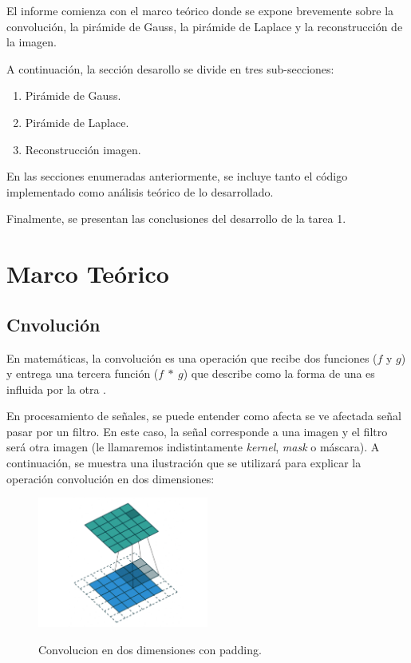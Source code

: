 \par El informe comienza con el marco teórico donde se expone brevemente sobre la convolución, la pirámide de Gauss, la pirámide de Laplace y la reconstrucción de la imagen. 

\par A continuación, la sección desarollo se divide en tres sub-secciones:
\begin{enumerate}
  \item Pirámide de Gauss.
  \item Pirámide de Laplace.
  \item Reconstrucción imagen. 
\end{enumerate}

\par En las secciones enumeradas anteriormente, se incluye tanto el código implementado como análisis teórico de lo desarrollado. 

\par Finalmente, se presentan las conclusiones del desarrollo de la tarea 1. 

\newpage
\section{Marco Teórico}
\subsection{Cnvolución}

\par En matemáticas, la convolución es una operación que recibe dos funciones ($f$ y $g$) y entrega una tercera función ($f \: \ast \: g $) que describe como la forma de una es influida por la otra \cite{WikiConv}.
\par En procesamiento de señales, se puede entender como afecta se ve afectada señal  pasar por un filtro. En este caso, la señal corresponde a una imagen y el filtro será otra imagen (le llamaremos indistintamente \textit{kernel}, \textit{mask} o máscara). A continuación, se muestra una ilustración que se utilizará para explicar la operación convolución en dos dimensiones:

\begin{figure}[H]
  \centering
  \includegraphics[width = 0.5\textwidth]{conv2d.png}
  \label{fig:conv2d}
  \caption{Convolucion en dos dimensiones con padding.\cite{imConv2d}}
\end{figure}

